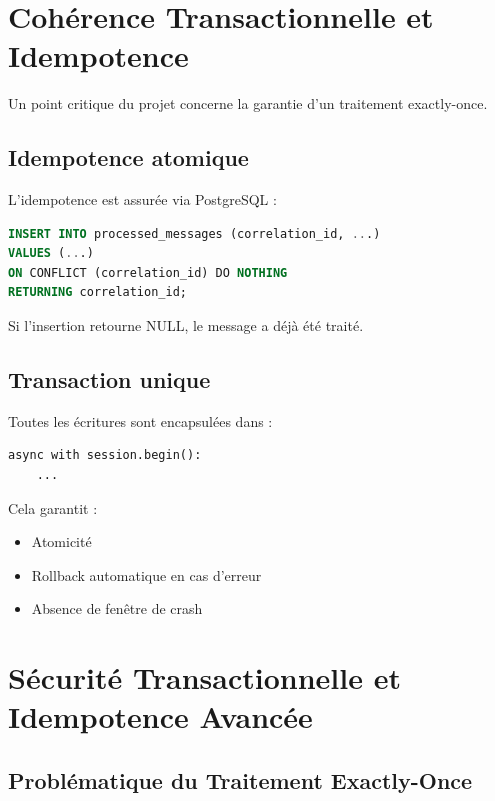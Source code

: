 \documentclass[12pt,a4paper]{article}
\begin{document}
\section{Cohérence Transactionnelle et Idempotence}

Un point critique du projet concerne la garantie d’un traitement exactly-once.

\subsection{Idempotence atomique}

L’idempotence est assurée via PostgreSQL :

\begin{lstlisting}[language=SQL]
INSERT INTO processed_messages (correlation_id, ...)
VALUES (...)
ON CONFLICT (correlation_id) DO NOTHING
RETURNING correlation_id;
\end{lstlisting}

Si l’insertion retourne NULL, le message a déjà été traité.

\subsection{Transaction unique}

Toutes les écritures sont encapsulées dans :

\begin{lstlisting}
async with session.begin():
    ...
\end{lstlisting}

Cela garantit :

\begin{itemize}
\item Atomicité
\item Rollback automatique en cas d'erreur
\item Absence de fenêtre de crash
\end{itemize}

\section{Sécurité Transactionnelle et Idempotence Avancée}

\subsection{Problématique du Traitement Exactly-Once}
\end{document}

